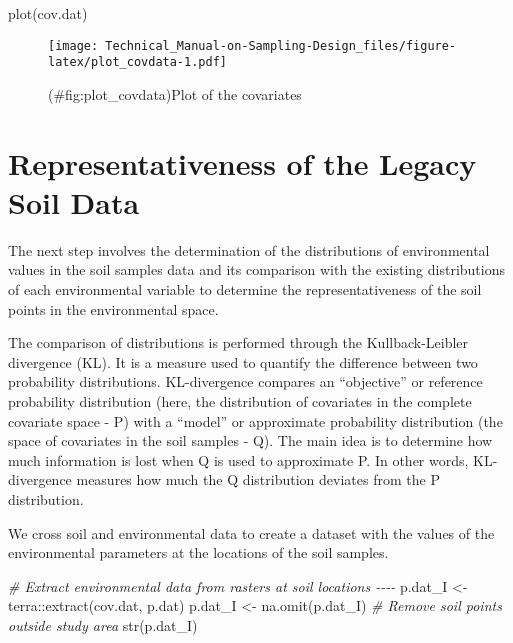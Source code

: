 \documentclass[
]{book}
\newenvironment{Shaded}{\begin{snugshade}}{\end{snugshade}}
\newcommand{\CommentTok}[1]{\textcolor[rgb]{0.56,0.35,0.01}{\textit{#1}}}
\newcommand{\FunctionTok}[1]{\textcolor[rgb]{0.00,0.00,0.00}{#1}}
\newcommand{\NormalTok}[1]{#1}
\newcommand{\OtherTok}[1]{\textcolor[rgb]{0.56,0.35,0.01}{#1}}
\newcommand{\SpecialCharTok}[1]{\textcolor[rgb]{0.00,0.00,0.00}{#1}}
\begin{document}
\begin{Shaded}
\begin{Highlighting}[]
   \FunctionTok{plot}\NormalTok{(cov.dat)}
\end{Highlighting}
\end{Shaded}

\begin{figure}
\centering
\texttt{[image: Technical\_Manual-on-Sampling-Design\_files/figure-latex/plot\_covdata-1.pdf]}
\caption{(\#fig:plot\_covdata)Plot of the covariates}
\end{figure}

\hypertarget{representativeness-of-the-legacy-soil-data}{%
\section{Representativeness of the Legacy Soil Data}\label{representativeness-of-the-legacy-soil-data}}

The next step involves the determination of the distributions of environmental values in the soil samples data and its comparison with the existing distributions of each environmental variable to determine the representativeness of the soil points in the environmental space.

The comparison of distributions is performed through the Kullback-Leibler divergence (KL). It is a measure used to quantify the difference between two probability distributions.
KL-divergence compares an ``objective'' or reference probability distribution (here, the distribution of covariates in the complete covariate space - P) with a ``model'' or approximate probability distribution (the space of covariates in the soil samples - Q). The main idea is to determine how much information is lost when Q is used to approximate P. In other words, KL-divergence measures how much the Q distribution deviates from the P distribution.

We cross soil and environmental data to create a dataset with the values of the environmental parameters at the locations of the soil samples.

\begin{Shaded}
\begin{Highlighting}[]
\CommentTok{\# Extract environmental data from rasters at soil locations {-}{-}{-}{-}}
\NormalTok{  p.dat\_I }\OtherTok{\textless{}{-}}\NormalTok{ terra}\SpecialCharTok{::}\FunctionTok{extract}\NormalTok{(cov.dat, p.dat)}
\NormalTok{  p.dat\_I }\OtherTok{\textless{}{-}} \FunctionTok{na.omit}\NormalTok{(p.dat\_I) }\CommentTok{\# Remove soil points outside study area}
  \FunctionTok{str}\NormalTok{(p.dat\_I)}
\end{Highlighting}
\end{Shaded}
\end{document}
